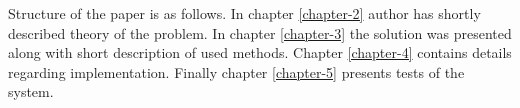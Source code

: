 Structure of the paper is as follows. In chapter \ref{chapter-2} author has shortly described theory of the problem. In chapter \ref{chapter-3} the solution was presented along with short description of used methods. Chapter \ref{chapter-4} contains details regarding implementation. Finally chapter \ref{chapter-5} presents tests of the system.